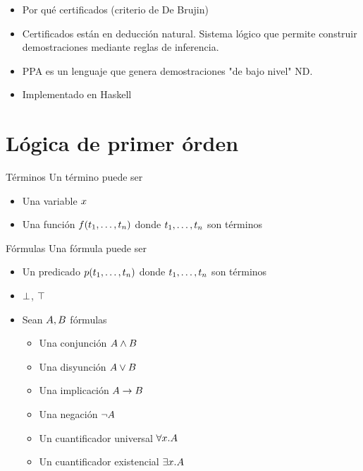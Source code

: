 \begin{itemize}
    \item Por qué certificados (criterio de De Brujin)
    \item Certificados están en deducción natural. Sistema lógico que permite
    construir demostraciones mediante reglas de inferencia.
    \item PPA es un lenguaje que genera demostraciones "de bajo nivel" ND.
    \item Implementado en Haskell
\end{itemize}

\section{Lógica de primer órden}

\begin{definition}{Términos}
    Un término puede ser
    \begin{itemize}
        \item Una variable $x$
        \item Una función $f(t_1, \dots, t_n)$ donde $t_1, \dots,
        t_n$ son términos
    \end{itemize}
\end{definition}

\begin{definition}{Fórmulas}
    Una fórmula puede ser
    \begin{itemize}
        \item Un predicado $p(t_1, \dots, t_n)$ donde $t_1, \dots,
        t_n$ son términos
        \item $\bot$, $\top$
        \item Sean $A, B$ fórmulas
        \begin{itemize}
            \item Una conjunción $A \wedge B$
            \item Una disyunción $A \vee B$
            \item Una implicación $A \to B$
            \item Una negación $\neg A$
            \item Un cuantificador universal $\forall x . A$
            \item Un cuantificador existencial $\exists x . A$
        \end{itemize}
    \end{itemize}
\end{definition}

